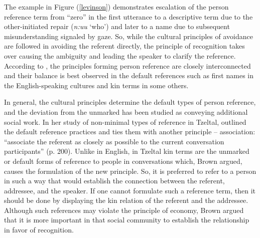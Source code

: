 \documentclass[12pt]{article}
\begin{document}
The example in Figure (\ref{levinson}) demonstrates escalation of the person reference term from ``zero'' in the first utterance to a descriptive term due to the other-initiated repair (\textit{n:uu} `who') and later to a name due to subsequent misunderstanding signaled by gaze. So, while the cultural principles of avoidance are followed in avoiding the referent directly, the principle of recognition takes over causing the ambiguity and leading the speaker to clarify the reference. According to \textcite{levinson2007}, the principles forming person reference are closely interconnected and their balance is best observed in the default references such as first names in the English-speaking cultures and kin terms in some others.  

In general, the cultural principles determine the default types of person reference, and the deviation from the unmarked has been studied as conveying additional social work. In her study of non-minimal types of reference in Tzeltal, \textcite{brown2007} outlined the default reference practices and ties them with another principle – association: ``associate the referent as closely as possible to the current conversation participants'' (p. 200). Unlike in English, in Tzeltal kin terms are the unmarked or default forms of reference to people in conversations which, Brown argued, causes the formulation of the new principle. So, it is preferred to refer to a person in such a way that would establish the connection between the referent, addressee, and the speaker. If one cannot formulate such a reference term, then it should be done by displaying the kin relation of the referent and the addressee. Although such references may violate the principle of economy, Brown argued that it is more important in that social community to establish the relationship in favor of recognition. 
\end{document}
